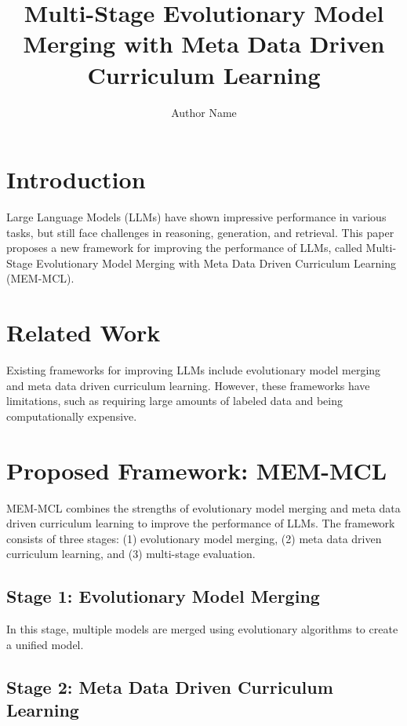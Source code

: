 \documentclass{article}
\begin{document}
\title{Multi-Stage Evolutionary Model Merging with Meta Data Driven Curriculum Learning}

\author{Author Name}

\maketitle

\section{Introduction}

Large Language Models (LLMs) have shown impressive performance in various tasks, but still face challenges in reasoning, generation, and retrieval. This paper proposes a new framework for improving the performance of LLMs, called Multi-Stage Evolutionary Model Merging with Meta Data Driven Curriculum Learning (MEM-MCL).

\section{Related Work}

Existing frameworks for improving LLMs include evolutionary model merging and meta data driven curriculum learning. However, these frameworks have limitations, such as requiring large amounts of labeled data and being computationally expensive.

\section{Proposed Framework: MEM-MCL}

MEM-MCL combines the strengths of evolutionary model merging and meta data driven curriculum learning to improve the performance of LLMs. The framework consists of three stages: (1) evolutionary model merging, (2) meta data driven curriculum learning, and (3) multi-stage evaluation.

\subsection{Stage 1: Evolutionary Model Merging}

In this stage, multiple models are merged using evolutionary algorithms to create a unified model.

\subsection{Stage 2: Meta Data Driven Curriculum Learning}
\end{document}
